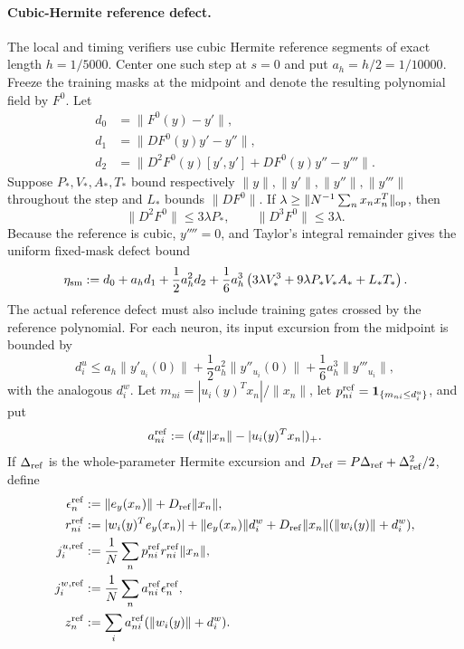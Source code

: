 \documentclass[10pt]{article}
\theoremstyle{remark}\newtheorem{remark}[theorem]{Remark}
\begin{document}
\paragraph{Cubic-Hermite reference defect.}
The local and timing verifiers use cubic Hermite reference segments of exact
length $h=1/5000$. Center one such step at $s=0$ and put
$a_h=h/2=1/10000$. Freeze the training masks at the midpoint and denote the
resulting polynomial field by $F^0$. Let
\begin{align*}
 d_0&=\|F^0(y)-y'\|,\\
 d_1&=\|DF^0(y)y'-y''\|,\\
 d_2&=\|D^2F^0(y)[y',y']+DF^0(y)y''-y'''\|.
\end{align*}
Suppose $P_*,V_*,A_*,T_*$ bound respectively
$\|y\|,\|y'\|,\|y''\|,\|y'''\|$ throughout the step and
$L_*$ bounds $\|DF^0\|$. If
$\lambda\ge\|N^{-1}\sum_nx_nx_n^T\|_{\rm op}$, then
\[
 \|D^2F^0\|\le3\lambda P_*,\qquad
 \|D^3F^0\|\le3\lambda.
\]
Because the reference is cubic, $y''''=0$, and Taylor's integral remainder
gives the uniform fixed-mask defect bound
\begin{equation}
 \eta_{\rm sm}:=
 d_0+a_hd_1+\frac12a_h^2d_2+
 \frac16a_h^3\left(
 3\lambda V_*^3+9\lambda P_*V_*A_*+L_*T_*
 \right).
 \label{eq:canonical-smooth-defect}
\end{equation}
The actual reference defect must also include training gates crossed by the
reference polynomial. For each neuron, its input excursion from the midpoint
is bounded by
\begin{equation}
 d_i^u\le a_h\|y'_{u_i}(0)\|+\frac12a_h^2\|y''_{u_i}(0)\|
       +\frac16a_h^3\|y'''_{u_i}\|,
 \label{eq:canonical-input-excursion}
\end{equation}
with the analogous $d_i^w$. Let
$m_{ni}=|u_i(y)^Tx_n|/\|x_n\|$, let
$p_{ni}^{\rm ref}=\mathbf1_{\{m_{ni}\le d_i^u\}}$, and put
\[
 a_{ni}^{\rm ref}:=(d_i^u\|x_n\|-|u_i(y)^Tx_n|)_+.
\]
If $\Delta_{\rm ref}$ is the whole-parameter Hermite excursion and
$D_{\rm ref}=P\Delta_{\rm ref}+\Delta_{\rm ref}^2/2$, define
\begin{align*}
 \epsilon_n^{\rm ref}&:=\|e_y(x_n)\|+D_{\rm ref}\|x_n\|,\\
 r_{ni}^{\rm ref}&:=|w_i(y)^Te_y(x_n)|
  +\|e_y(x_n)\|d_i^w
  +D_{\rm ref}\|x_n\|(\|w_i(y)\|+d_i^w),\\
 j_i^{u,{\rm ref}}&:=\frac1N\sum_n
  p_{ni}^{\rm ref}r_{ni}^{\rm ref}\|x_n\|,\\
 j_i^{w,{\rm ref}}&:=\frac1N\sum_n
  a_{ni}^{\rm ref}\epsilon_n^{\rm ref},\\
 z_n^{\rm ref}&:=\sum_i a_{ni}^{\rm ref}(\|w_i(y)\|+d_i^w).
\end{align*}
\end{document}
